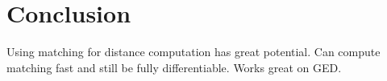 \section{Conclusion}

Using matching for distance computation has great potential. Can compute matching fast and still be fully differentiable. Works great on GED.
